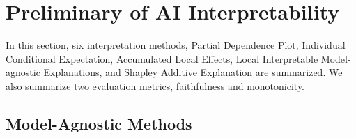 %





\section{Preliminary of AI Interpretability}

In this section, six interpretation methods, Partial Dependence Plot, Individual Conditional Expectation, Accumulated Local Effects, Local Interpretable Model-agnostic Explanations, and Shapley Additive Explanation are summarized. We also summarize two evaluation metrics, faithfulness and monotonicity.

\subsection{Model-Agnostic Methods}

